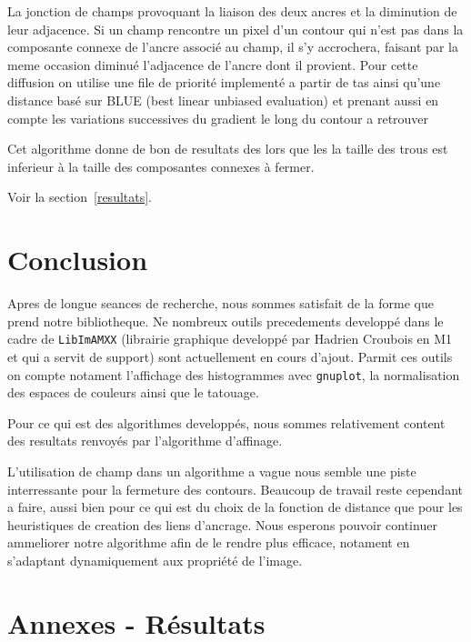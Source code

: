 La jonction de champs provoquant la liaison des deux ancres et la diminution de leur adjacence. Si un champ rencontre un pixel d'un contour qui n'est pas dans la composante connexe de l'ancre associé au champ, il s'y accrochera, faisant par la meme occasion diminué l'adjacence de l'ancre dont il provient.
Pour cette diffusion on utilise une file de priorité implementé a partir de tas ainsi qu'une distance basé sur \textsc{BLUE} (best linear unbiased evaluation) et prenant aussi en compte les variations successives du gradient le long du contour a retrouver

Cet algorithme donne de bon de resultats des lors que les la taille des trous est inferieur à la taille des composantes connexes à fermer. 

Voir la section~\ref{resultats}.

\section*{Conclusion}

Apres de longue seances de recherche, nous sommes satisfait de la forme que prend notre bibliotheque. Ne nombreux outils precedements developpé dans le cadre de \texttt{LibImAMXX} (librairie graphique developpé par Hadrien Croubois en M1 et qui a servit de support) sont actuellement en cours d'ajout. Parmit ces outils on compte notament l'affichage des histogrammes avec \texttt{gnuplot}, la normalisation des espaces de couleurs ainsi que le tatouage.

Pour ce qui est des algorithmes developpés, nous sommes relativement content des resultats renvoyés par l'algorithme d'affinage.

L'utilisation de champ dans un algorithme a vague nous semble une piste interressante pour la fermeture des contours. Beaucoup de travail reste cependant a faire, aussi bien pour ce qui est du choix de la fonction de distance que pour les heuristiques de creation des liens d'ancrage.
Nous esperons pouvoir continuer ammeliorer notre algorithme afin de le rendre plus efficace, notament en s'adaptant dynamiquement aux propriété de l'image.



\newpage
\section*{Annexes - Résultats} \label{resultats}


